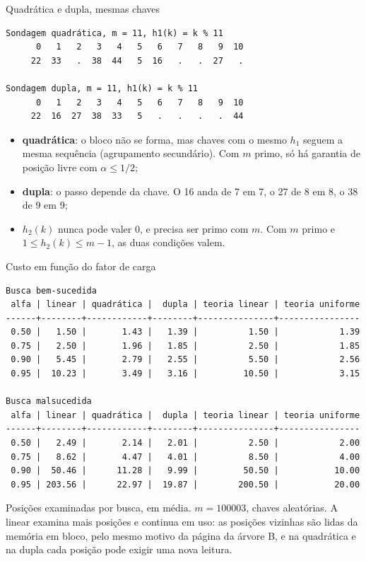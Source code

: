 \documentclass{beamer}
\begin{document}
\begin{frame}[fragile]{Quadrática e dupla, mesmas chaves}
	\begin{verbatim}
Sondagem quadrática, m = 11, h1(k) = k % 11
      0   1   2   3   4   5   6   7   8   9  10
     22  33   .  38  44   5  16   .   .  27   .

Sondagem dupla, m = 11, h1(k) = k % 11
      0   1   2   3   4   5   6   7   8   9  10
     22  16  27  38  33   5   .   .   .   .  44
\end{verbatim}

	\begin{itemize}
		\item \textbf{quadrática}: o bloco não se forma, mas chaves com o mesmo
		      $h_1$ seguem a mesma sequência (agrupamento secundário). Com $m$ primo,
		      só há garantia de posição livre com $\alpha \le 1/2$;
		\item \textbf{dupla}: o passo depende da chave. O 16 anda de 7 em 7, o 27
		      de 8 em 8, o 38 de 9 em 9;
		\item $h_2(k)$ nunca pode valer 0, e precisa ser primo com $m$. Com $m$
		      primo e $1 \le h_2(k) \le m-1$, as duas condições valem.
	\end{itemize}
\end{frame}

\begin{frame}[fragile]{Custo em função do fator de carga}
	\begin{verbatim}
Busca bem-sucedida
 alfa | linear | quadrática |  dupla | teoria linear | teoria uniforme
------+--------+------------+--------+---------------+----------------
 0.50 |   1.50 |       1.43 |   1.39 |          1.50 |            1.39
 0.75 |   2.50 |       1.96 |   1.85 |          2.50 |            1.85
 0.90 |   5.45 |       2.79 |   2.55 |          5.50 |            2.56
 0.95 |  10.23 |       3.49 |   3.16 |         10.50 |            3.15

Busca malsucedida
 alfa | linear | quadrática |  dupla | teoria linear | teoria uniforme
------+--------+------------+--------+---------------+----------------
 0.50 |   2.49 |       2.14 |   2.01 |          2.50 |            2.00
 0.75 |   8.62 |       4.47 |   4.01 |          8.50 |            4.00
 0.90 |  50.46 |      11.28 |   9.99 |         50.50 |           10.00
 0.95 | 203.56 |      22.97 |  19.87 |        200.50 |           20.00
\end{verbatim}

	\footnotesize Posições examinadas por busca, em média. $m = 100003$, chaves
	aleatórias. A linear examina mais posições e continua em uso: as posições
	vizinhas são lidas da memória em bloco, pelo mesmo motivo da página da árvore
	B, e na quadrática e na dupla cada posição pode exigir uma nova leitura.
\end{frame}
\end{document}
